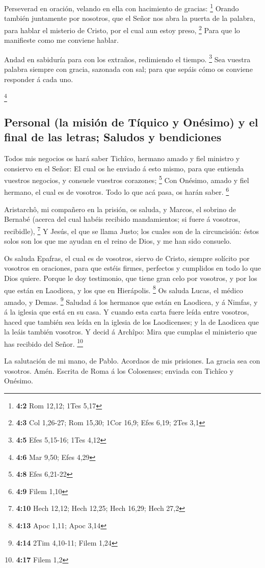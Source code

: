  Perseverad en oración, velando en ella con hacimiento de
gracias: \footnote{\textbf{4:2} Rom 12,12; 1Tes 5,17} 
Orando también juntamente por nosotros, que el Señor nos abra la puerta
de la palabra, para hablar el misterio de Cristo, por el cual aun estoy
preso, \footnote{\textbf{4:3} Col 1,26-27; Rom 15,30; 1Cor 16,9; Efes
  6,19; 2Tes 3,1}  Para que lo manifieste como me conviene
hablar.

 Andad en sabiduría para con los extraños, redimiendo el
tiempo. \footnote{\textbf{4:5} Efes 5,15-16; 1Tes 4,12}  Sea
vuestra palabra siempre con gracia, sazonada con sal; para que sepáis
cómo os conviene responder á cada uno.

\footnote{\textbf{4:6} Mar 9,50; Efes 4,29}

\hypertarget{personal-la-misiuxf3n-de-tuxedquico-y-onuxe9simo-y-el-final-de-las-letras-saludos-y-bendiciones}{%
\subsection{Personal (la misión de Tíquico y Onésimo) y el final de las
letras; Saludos y
bendiciones}\label{personal-la-misiuxf3n-de-tuxedquico-y-onuxe9simo-y-el-final-de-las-letras-saludos-y-bendiciones}}

 Todos mis negocios os hará saber Tichîco, hermano amado y
fiel ministro y consiervo en el Señor:  El cual os he
enviado á esto mismo, para que entienda vuestros negocios, y consuele
vuestros corazones; \footnote{\textbf{4:8} Efes 6,21-22} 
Con Onésimo, amado y fiel hermano, el cual es de vosotros. Todo lo que
acá pasa, os harán saber. \footnote{\textbf{4:9} Filem 1,10}

 Aristarchô, mi compañero en la prisión, os saluda, y
Marcos, el sobrino de Bernabé (acerca del cual habéis recibido
mandamientos; si fuere á vosotros, recibidle), \footnote{\textbf{4:10}
  Hech 12,12; Hech 12,25; Hech 16,29; Hech 27,2}  Y Jesús,
el que se llama Justo; los cuales son de la circuncisión: éstos solos
son los que me ayudan en el reino de Dios, y me han sido consuelo.

 Os saluda Epafras, el cual es de vosotros, siervo de
Cristo, siempre solícito por vosotros en oraciones, para que estéis
firmes, perfectos y cumplidos en todo lo que Dios quiere. 
Porque le doy testimonio, que tiene gran celo por vosotros, y por los
que están en Laodicea, y los que en Hierápolis. \footnote{\textbf{4:13}
  Apoc 1,11; Apoc 3,14}  Os saluda Lucas, el médico amado,
y Demas. \footnote{\textbf{4:14} 2Tim 4,10-11; Filem 1,24} 
Saludad á los hermanos que están en Laodicea, y á Nimfas, y á la iglesia
que está en su casa.  Y cuando esta carta fuere leída entre
vosotros, haced que también sea leída en la iglesia de los Laodicenses;
y la de Laodicea que la leáis también vosotros.  Y decid á
Archîpo: Mira que cumplas el ministerio que has recibido del Señor.
\footnote{\textbf{4:17} Filem 1,2}

 La salutación de mi mano, de Pablo. Acordaos de mis
prisiones. La gracia sea con vosotros. Amén. Escrita de Roma á los
Colosenses; enviada con Tichîco y Onésimo.

